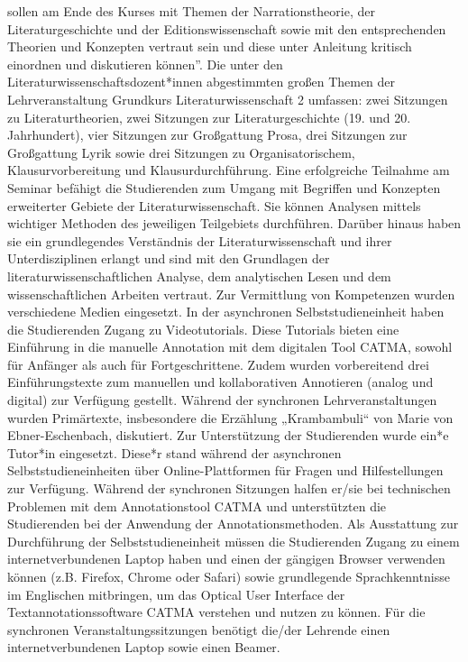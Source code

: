 \documentclass[
          a4paper,
        ]{article}
\begin{document}
sollen am Ende des Kurses mit Themen der Narrationstheorie, der
Literaturgeschichte und der Editionswissenschaft sowie mit den
entsprechenden Theorien und Konzepten vertraut sein und diese unter
Anleitung kritisch einordnen und diskutieren können''. Die unter den
Literaturwissenschaftsdozent*innen abgestimmten großen Themen der
Lehrveranstaltung Grundkurs Literaturwissenschaft 2 umfassen: zwei
Sitzungen zu Literaturtheorien, zwei Sitzungen zur Literaturgeschichte
(19. und 20. Jahrhundert), vier Sitzungen zur Großgattung Prosa, drei
Sitzungen zur Großgattung Lyrik sowie drei Sitzungen zu
Organisatorischem, Klausurvorbereitung und Klausurdurchführung. Eine
erfolgreiche Teilnahme am Seminar befähigt die Studierenden zum Umgang
mit Begriffen und Konzepten erweiterter Gebiete der
Literaturwissenschaft. Sie können Analysen mittels wichtiger Methoden
des jeweiligen Teilgebiets durchführen. Darüber hinaus haben sie ein
grundlegendes Verständnis der Literaturwissenschaft und ihrer
Unterdisziplinen erlangt und sind mit den Grundlagen der
literaturwissenschaftlichen Analyse, dem analytischen Lesen und dem
wissenschaftlichen Arbeiten vertraut. Zur Vermittlung von Kompetenzen
wurden verschiedene Medien eingesetzt. In der asynchronen
Selbststudieneinheit haben die Studierenden Zugang zu Videotutorials.
Diese Tutorials bieten eine Einführung in die manuelle Annotation mit
dem digitalen Tool CATMA, sowohl für Anfänger als auch für
Fortgeschrittene. Zudem wurden vorbereitend drei Einführungstexte zum
manuellen und kollaborativen Annotieren (analog und digital) zur
Verfügung gestellt. Während der synchronen Lehrveranstaltungen wurden
Primärtexte, insbesondere die Erzählung „Krambambuli`` von Marie von
Ebner-Eschenbach, diskutiert. Zur Unterstützung der Studierenden wurde
ein*e Tutor*in eingesetzt. Diese*r stand während der asynchronen
Selbststudieneinheiten über Online-Plattformen für Fragen und
Hilfestellungen zur Verfügung. Während der synchronen Sitzungen halfen
er/sie bei technischen Problemen mit dem Annotationstool CATMA und
unterstützten die Studierenden bei der Anwendung der
Annotationsmethoden. Als Ausstattung zur Durchführung der
Selbststudieneinheit müssen die Studierenden Zugang zu einem
internetverbundenen Laptop haben und einen der gängigen Browser
verwenden können (z.B. Firefox, Chrome oder Safari) sowie grundlegende
Sprachkenntnisse im Englischen mitbringen, um das Optical User Interface
der Textannotationssoftware CATMA verstehen und nutzen zu können. Für
die synchronen Veranstaltungssitzungen benötigt die/der Lehrende einen
internetverbundenen Laptop sowie einen Beamer.
\end{document}

